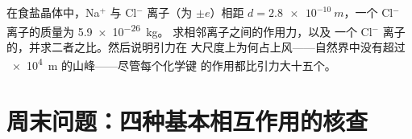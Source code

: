 \begin{exercise}[$\star\star\star$]\label{exo:g11:fundamental-interactions:15}
在食盐晶体中，Na$^{+}$ 与 Cl$^{-}$ 离子（为 $\pm e$）相距
$d = \qty{2.8e-10}{m}$，一个 Cl$^{-}$ 离子的质量为 \qty{5.9e-26}{kg}。
求相邻离子之间的作用力，以及
一个 Cl$^{-}$ 离子的，并求二者之比。然后说明引力在
大尺度上为何占上风——自然界中没有超过 \qty{e4}{m} 的山峰——尽管每个化学键
的作用都比引力大十五个。
\end{exercise}

\section{周末问题：四种基本相互作用的核查}

